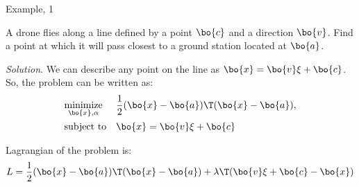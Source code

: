 \documentclass{beamer}
\begin{document}
\begin{frame}{Example, 1}
	\begin{flushleft}
		
		A drone flies along a line defined by a point $\bo{c}$ and a direction $\bo{v}$. Find a point at which it will pass closest to a ground station located at $\bo{a}$.
		
		\bigskip
		
		\emph{Solution}. We can describe any point on the line as $\bo{x} = \bo{v} \xi + \bo{c}$. So, the problem can be written as:
		\begin{equation}
			\begin{aligned}
				& \underset{\bo{x}, \alpha}{\text{minimize}}
				& & \frac{1}{2}(\bo{x}- \bo{a})\T(\bo{x}- \bo{a}), \\
				& \text{subject to}
				& & \bo{x} = \bo{v} \xi + \bo{c}
			\end{aligned}
		\end{equation}
		
		Lagrangian of the problem is:
		\begin{equation}
			L =  \frac{1}{2}(\bo{x}- \bo{a})\T(\bo{x}- \bo{a}) + \lambda\T  ( \bo{v} \xi + \bo{c} - \bo{x})
		\end{equation}
		
	
		
	\end{flushleft}
\end{frame}
\end{document}
